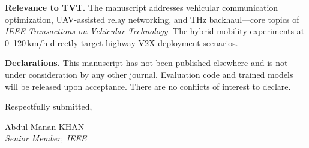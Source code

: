 \documentclass[11pt]{article}
\begin{document}
\medskip
\noindent\textbf{Relevance to TVT.}
The manuscript addresses vehicular communication optimization, UAV-assisted relay networking, and THz backhaul---core topics of \textit{IEEE Transactions on Vehicular Technology}. The hybrid mobility experiments at 0--120\,km/h directly target highway V2X deployment scenarios.

\medskip
\noindent\textbf{Declarations.}
This manuscript has not been published elsewhere and is not under consideration by any other journal. Evaluation code and trained models will be released upon acceptance. There are no conflicts of interest to declare.

\bigskip
\noindent
Respectfully submitted,

\bigskip
\noindent
Abdul Manan KHAN\\
\textit{Senior Member, IEEE}
\end{document}
